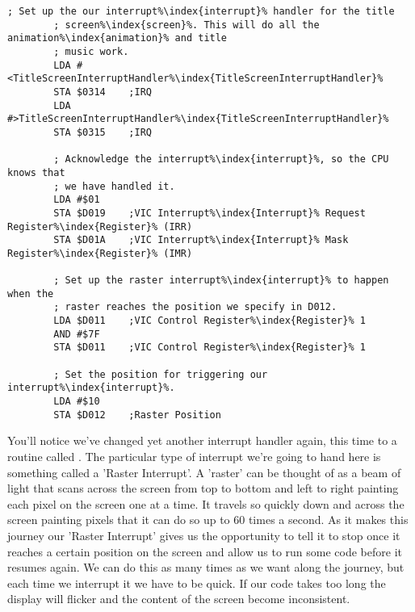 \begin{lstlisting}[caption=In \icode{InitializeSpritesAndInterruptsForTitleScreen\index{InitializeSpritesAndInterruptsForTitleScreen}},escapechar=\%]
        ; Set up the our interrupt%\index{interrupt}% handler for the title
        ; screen%\index{screen}%. This will do all the animation%\index{animation}% and title
        ; music work.
        LDA #<TitleScreenInterruptHandler%\index{TitleScreenInterruptHandler}%
        STA $0314    ;IRQ
        LDA #>TitleScreenInterruptHandler%\index{TitleScreenInterruptHandler}%
        STA $0315    ;IRQ

        ; Acknowledge the interrupt%\index{interrupt}%, so the CPU knows that
        ; we have handled it.
        LDA #$01
        STA $D019    ;VIC Interrupt%\index{Interrupt}% Request Register%\index{Register}% (IRR)
        STA $D01A    ;VIC Interrupt%\index{Interrupt}% Mask Register%\index{Register}% (IMR)

        ; Set up the raster interrupt%\index{interrupt}% to happen when the
        ; raster reaches the position we specify in D012.
        LDA $D011    ;VIC Control Register%\index{Register}% 1
        AND #$7F
        STA $D011    ;VIC Control Register%\index{Register}% 1

        ; Set the position for triggering our interrupt%\index{interrupt}%.
        LDA #$10
        STA $D012    ;Raster Position
\end{lstlisting}

You'll notice we've changed yet another interrupt handler again, this time to a routine called
. The particular type of interrupt we're going
to hand here is something
called a 'Raster Interrupt'. A 'raster' can be thought of as a beam of light that scans
across the screen from top to bottom and left to right painting each pixel on the screen
one at a time. It travels so quickly down and across the screen painting pixels that it
can do so up to 60 times a second. As it makes this journey our 'Raster Interrupt' gives
us the opportunity to tell it to stop once it reaches a certain position on the screen
and allow us to run some code before it resumes again. We can do this as many times as
we want along the journey, but each time we interrupt it we have to be quick. If our code
takes too long the display will flicker and the content of the screen become inconsistent.

